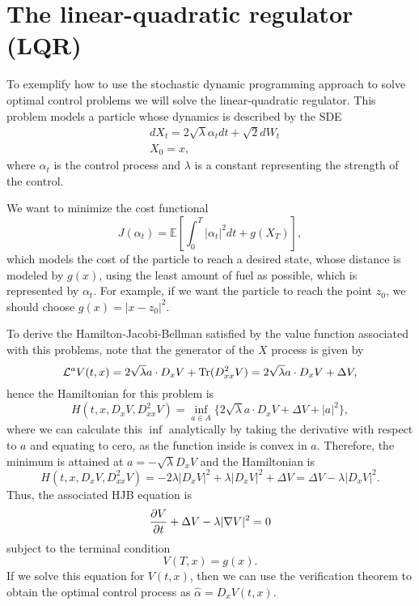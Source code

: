 \section*{The linear-quadratic regulator (LQR)}
To exemplify how to use the stochastic dynamic programming approach to solve optimal control problems we will solve the linear-quadratic regulator. This problem models a particle whose dynamics is described by the SDE
\begin{equation}
	\begin{split}
		&dX_t=2\sqrt{\lambda}\alpha_t dt+\sqrt{2}dW_t\\
		&X_0=x,
	\end{split}
\end{equation} 
where $\alpha_t$ is the control process and $\lambda$ is a constant representing the strength of the control. 

We want to minimize the cost functional
\begin{equation}
	J(\alpha_t)=\mathbb{E}\left[\int_{0}^{T}|\alpha_t|^2 dt +g(X_T)\right],
\end{equation}
which models the cost of the particle to reach a desired state, whose distance is modeled by $g(x)$, using the least amount of fuel as possible, which is represented by $\alpha_t$. For example, if we want the particle to reach the point $z_0$, we should choose $g(x)=|x-z_0|^2$.

To derive the Hamilton-Jacobi-Bellman satisfied by the value function associated with this problems, note that the generator of the $X$ process is given by
\begin{equation}
	\mathcal{L}^a V(t,x)=2 \sqrt{\lambda} a\cdot D_x V+\operatorname{Tr}(D_{xx}^2 V)= 2 \sqrt{\lambda}a\cdot D_x V +\Delta V,
\end{equation}
hence the Hamiltonian for this problem is 
\begin{equation}
	H(t,x,D_x V,D_{xx}^2 V)=\inf_{a\in A}\{2 \sqrt{\lambda}a\cdot D_x V +\Delta V+|a|^2\},
\end{equation}
where we can calculate this $\inf$ analytically by taking the derivative with respect to $a$ and equating to cero, as the function inside is convex in $a$. Therefore, the minimum is attained at $a=-\sqrt{\lambda}D_x V$ and the Hamiltonian is 
\begin{equation}
	H(t,x,D_x V,D_{xx}^2 V)=-2\lambda|D_x V|^2+\lambda|D_x V|^2+\Delta V=\Delta V -\lambda |D_x V|^2.
\end{equation}
Thus, the associated HJB equation is 
\begin{equation}
	\frac{\partial V}{\partial t}+\Delta V -\lambda|\nabla V|^2=0
\end{equation}
subject to the terminal condition
\begin{equation}
	V(T,x)=g(x).
\end{equation}
If we solve this equation for $V(t,x)$, then we can use the verification theorem to obtain the optimal control process as $\hat{\alpha}=D_x V(t,x)$. 

